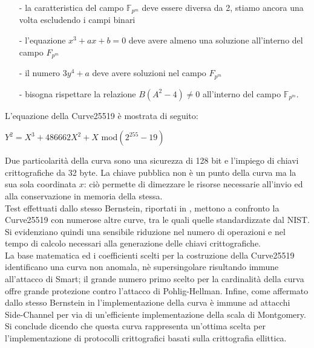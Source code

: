 \documentclass[a4paper,12pt]{tesiinfo}
\begin{document}
\begin{itemize}
      \item[-] la caratteristica del campo $\mathbb{F}_{p^m}$ deve essere diversa da 2, stiamo ancora una volta escludendo i campi binari
      \item[-] l'equazione $x^3+ax+b=0$ deve avere almeno una soluzione all'interno del campo $F_{p^m}$
      \item[-] il numero $3y^4+a$ deve avere soluzioni nel campo $F_{p^m}$
      \item[-] bisogna rispettare la relazione $B(A^2-4) \ne 0$ all'interno del campo $\mathbb{F}_{p^m}$.
\end{itemize}
L'equazione della Curve25519 \`e mostrata di seguito:
\begin{center}
$Y^2=X^3+486662X^2+X$ mod$(2^{255}-19)$
\end{center}
Due particolarit\`a della curva sono una sicurezza di 128 bit e l'impiego di chiavi crittografiche da 32 byte. La chiave pubblica non \`e un punto della curva ma la sua sola coordinata $x$: ci\`o permette di dimezzare le risorse necessarie all'invio ed alla conservazione in memoria della stessa. 
\\
Test effettuati dallo stesso Bernstein, riportati in \cite{curve25519 fast, speed table}, mettono a confronto la Curve25519 con numerose altre curve, tra le quali quelle standardizzate dal NIST. Si evidenziano quindi una sensibile riduzione nel numero di operazioni e nel tempo di calcolo necessari alla generazione delle chiavi crittografiche. 
\\
La base matematica ed i coefficienti scelti per la costruzione della Curve25519 identificano una curva non anomala, n\`e supersingolare risultando immune all'attacco di Smart; il grande numero primo scelto per la cardinalit\`a della curva offre grande protezione contro l'attacco di Pohlig-Hellman. Infine, come affermato dallo stesso Bernstein in \cite{curve25519 fast} l'implementazione della curva \cite{impl 25519} \`e immune ad attacchi Side-Channel per via di un'efficiente implementazione della scala di Montgomery.
\\
Si conclude dicendo che questa curva rappresenta un'ottima scelta per l'implementazione di protocolli crittografici basati sulla crittografia ellittica.
%
%
%
%
%
%
%
%
%
%
\end{document}

